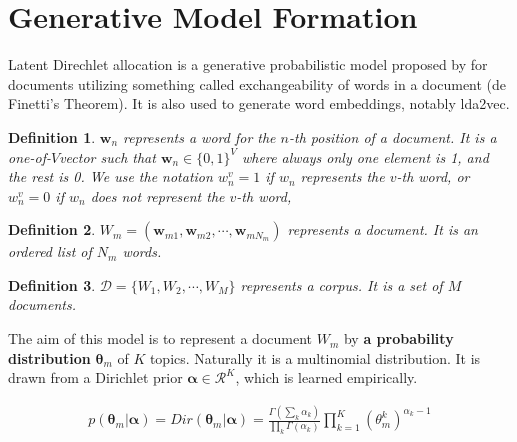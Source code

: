\documentclass[a4]{article}
\newtheorem{defn}{Definition}
\begin{document}





\section{Generative Model Formation}
Latent Direchlet allocation is a generative probabilistic model proposed by \cite{NIPS2001_2070} for documents
utilizing something called exchangeability of words in a document 
(de Finetti's Theorem). It is also used to generate word embeddings, notably lda2vec\cite{DBLP:journals/corr/Moody16}.

\begin{defn}
$\mathbf{w}_n$ represents a word for the $n$-th position of a document.
It is a one-of-$V$vector such that $\mathbf{w}_n \in \{0,1\}^V$ where always only one
element is 1, and the rest is 0. We use the notation $w^v_n = 1$ 
if $w_n$ represents the $v$-th word, or $w^v_n = 0$ if $w_n$ does not 
represent the $v$-th word,
\end{defn}

\begin{defn}
$W_m = (\mathbf{w}_{m1}, \mathbf{w}_{m2},\cdots, \mathbf{w}_{mN_{m}})$
represents a document. It is an ordered list of $N_m$ words.
\end{defn}

\begin{defn}
$\mathcal{D} = \{ W_1, W_2,\cdots, W_M\}$ represents a corpus.
It is a set of $M$ documents.
\end{defn}

The aim of this model is to represent a document $W_m$ by 
{\bf a probability distribution} $\bm{\theta}_m$ of $K$ topics.
Naturally it is a multinomial distribution.
It is drawn from a Dirichlet prior $\bm{\alpha} \in \mathcal{R}^K$,
which is learned empirically.

\begin{equation}
\begin{aligned}
p( \bm{\theta}_m | \bm{\alpha} )
    = Dir( \bm{\theta}_m | \bm{\alpha} )
    = \frac{  \Gamma( \sum_k \alpha_k )  }
           { \prod_k \Gamma(\alpha_k)    }
      \prod_{k=1}^K ( \theta_m^k )^{\alpha_k - 1}\label{p(theta_m|alpha)}
\end{aligned}
\end{equation}
\end{document}
